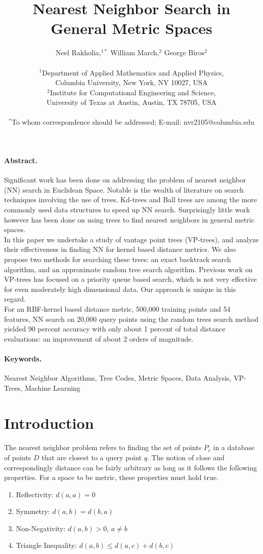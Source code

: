 \documentclass[11pt]{article}
\title{Nearest Neighbor Search in General Metric Spaces}
\author
{Neel Rakholia,$^{1\ast}$ William March,$^{2}$ George Biros$^{2}$\\
\\
\normalsize{$^{1}$Department of Applied Mathematics and Applied Physics,}\\
\normalsize{Columbia University,}
\normalsize{New York, NY 10027, USA}\\
\normalsize{$^{2}$Institute for Computational Engineering and Science,}\\
\normalsize{University of Texas at Austin,}
\normalsize{Austin, TX 78705, USA}\\
\\
\normalsize{$^\ast$To whom correspondence should be addressed; E-mail:  nvr2105@columbia.edu}
}
\date{}
\begin{document}
\maketitle 

\paragraph{Abstract.} Significant work has been done on addressing the problem of nearest neighbor (NN) search in Euclidean Space. Notable is the wealth of literature on search techniques involving the use of trees. Kd-trees and Ball trees are among the more commonly used data structures to speed up NN search. Surprisingly little work however has been done on using trees to find nearest neighbors in general metric spaces.
\\
\indent In this paper we undertake a study of vantage point trees (VP-trees), and analyze their effectiveness in finding NN for kernel based distance metrics. We also propose two methods for searching these trees: an exact backtrack search algorithm, and an approximate random tree search algorithm. Previous work on VP-trees has focused on a priority queue based search, which is not very effective for even moderately high dimensional data. Our approach is unique in this regard.
\\
\indent For an RBF-kernel based distance metric, 500,000 training points and 54 features, NN search on 20,000 query points using the random trees search method yielded 90 percent accuracy with only about 1 percent of total distance evaluations: an improvement of about 2 orders of magnitude. 

\paragraph{Keywords.} Nearest Neighbor Algorithms, Tree Codes, Metric Spaces, Data Analysis, VP-Trees, Machine Learning

\section{Introduction} 
\paragraph{} The nearest neighbor problem refers to finding the set of points $P_c$ in a database of points $D$ that are closest to a query point $q$. The notion of close and correspondingly distance can be fairly arbitrary as long as it follows the following properties. For a space to be metric, these properties must hold true. ~\cite{Nayar08}
\begin{enumerate}
\item Reflectivity: $d(a,a) = 0$
\item Symmetry: $d(a,b) = d(b,a)$
\item Non-Negativity: $d(a,b) > 0$, $a \neq b$
\item Triangle Inequality: $d(a, b) \leq d(a, c) + d(b, c)$
\end{enumerate}
\end{document}
